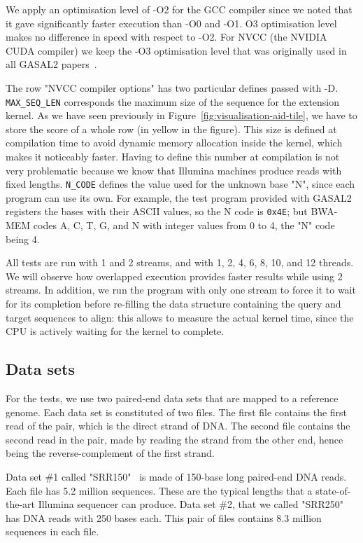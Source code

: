 We apply an optimisation level of -O2 for the GCC compiler since we noted that it gave significantly faster execution than -O0 and -O1. O3 optimisation level makes no difference in speed with respect to -O2. For NVCC (the NVIDIA CUDA compiler) we keep the -O3 optimisation level that was originally used in all GASAL2 papers~\cite{Ahmed:gasal}.

The row "NVCC compiler options" has two particular defines passed with -D. \verb|MAX_SEQ_LEN| corresponds the maximum size of the sequence for the extension kernel. As we have seen previously in Figure~\ref{fig:visualisation-aid-tile}, we have to store the score of a whole row (in yellow in the figure). This size is defined at compilation time to avoid dynamic memory allocation inside the kernel, which makes it noticeably faster. Having to define this number at compilation is not very problematic because we know that Illumina machines produce reads with fixed lengths. \verb|N_CODE| defines the value used for the unknown base "N", since each program can use its own. For example, the test program provided with GASAL2 registers the bases with their ASCII values, so the N code is \verb|0x4E|; but BWA-MEM codes A, C, T, G, and N with integer values from 0 to 4, the "N" code being 4.

All tests are run with 1 and 2 streams, and with 1, 2, 4, 6, 8, 10, and 12 threads. We will observe how overlapped execution provides faster results while using 2 streams. In addition, we run the program with only one stream to force it to wait for its completion before re-filling the data structure containing the query and target sequences to align: this allows to measure the actual kernel time, since the CPU is actively waiting for the kernel to complete. 

\subsection{Data sets}

For the tests, we use two paired-end data sets that are mapped to a reference genome. Each data set is constituted of two files. The first file contains the first read of the pair, which is the direct strand of DNA. The second file contains the second read in the pair, made by reading the strand from the other end, hence being the reverse-complement of the first strand.

Data set \#1 called "SRR150"~\cite{ncbi:srr150} is made of 150-base long paired-end DNA reads. Each file has 5.2 million sequences. These are the typical lengths that a state-of-the-art Illumina sequencer can produce. Data set \#2, that we called "SRR250"~\cite{ncbi:srr250} has DNA reads with 250 bases each. This pair of files contains 8.3 million sequences in each file.

